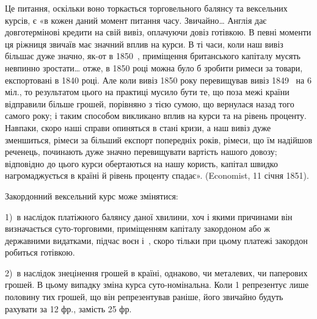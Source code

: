 Це питання, оскільки воно торкається торговельного балянсу та вексельних
курсів, є «в кожен даний момент питання часу. Звичайно\dots{} Англія дає
довготермінові кредити на свій вивіз, оплачуючи довіз готівкою. В певні моменти
ця ріжниця звичаїв має значний вплив на курси. В ті часи, коли наш
вивіз більшає дуже значно, як-от в 1850~, приміщення британського капіталу
мусять невпинно зростати\dots{} отже, в 1850 році можна було б зробити римеси
за товари, експортовані в 1840 році. Але коли вивіз 1850 року перевищував
вивіз 1849~ на 6 міл., то результатом цього на практиці мусило бути те, що
поза межі країни відправили більше грошей, порівняно з тією сумою, що вернулася
назад того самого року; і таким способом викликано вплив на курси
та на рівень проценту. Навпаки, скоро наші справи опиняться в стані кризи,
а наш вивіз дуже зменшиться, рімеси за більший експорт попередніх років, рімеси,
що їм надійшов реченець, починають дуже значно перевищувати вартість нашого
довозу; відповідно до цього курси обертаються на нашу користь, капітал швидко
нагромаджується в країні й рівень проценту спадає». (Economist, 11 січня 1851).

Закордонний вексельний курс може змінятися:

1)~в наслідок платіжного балянсу даної хвилини, хоч і якими причинами він
визначається суто-торговими, приміщенням капіталу закордоном або ж державними
видатками, підчас воєн і~, скоро тільки при цьому платежі закордон
робиться готівкою.

2)~в наслідок знецінення грошей в країні, однаково, чи металевих, чи
паперових грошей. В цьому випадку зміна курса суто-номінальна. Коли 1
репрезентує лише половину тих грошей, що він репрезентував раніше, його
звичайно будуть рахувати за 12 фр., замість 25 фр.
